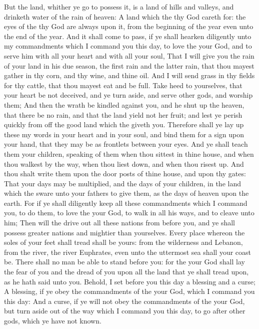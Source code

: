 \begin{biblechapter}
\verse But the land, whither ye go to possess it, is a land of hills and valleys, and drinketh water of the rain of heaven:
\verse A land which the \LORD thy God careth for: the eyes of the \LORD thy God are always upon it, from the beginning of the year even unto the end of the year.
\verse And it shall come to pass, if ye shall hearken diligently unto my commandments which I command you this day, to love the \LORD your God, and to serve him with all your heart and with all your soul,
\verse That I will give you the rain of your land in his due season, the first rain and the latter rain, that thou mayest gather in thy corn, and thy wine, and thine oil.
\verse And I will send grass in thy fields for thy cattle, that thou mayest eat and be full.
\verse Take heed to yourselves, that your heart be not deceived, and ye turn aside, and serve other gods, and worship them;
\verse And then the \LORDs wrath be kindled against you, and he shut up the heaven, that there be no rain, and that the land yield not her fruit; and lest ye perish quickly from off the good land which the \LORD giveth you.
\verse Therefore shall ye lay up these my words in your heart and in your soul, and bind them for a sign upon your hand, that they may be as frontlets between your eyes.
\verse And ye shall teach them your children, speaking of them when thou sittest in thine house, and when thou walkest by the way, when thou liest down, and when thou risest up.
\verse And thou shalt write them upon the door posts of thine house, and upon thy gates:
\verse That your days may be multiplied, and the days of your children, in the land which the \LORD sware unto your fathers to give them, as the days of heaven upon the earth.
\verse For if ye shall diligently keep all these commandments which I command you, to do them, to love the \LORD your God, to walk in all his ways, and to cleave unto him;
\verse Then will the \LORD drive out all these nations from before you, and ye shall possess greater nations and mightier than yourselves.
\verse Every place whereon the soles of your feet shall tread shall be yours: from the wilderness and Lebanon, from the river, the river Euphrates, even unto the uttermost sea shall your coast be.
\verse There shall no man be able to stand before you: for the \LORD your God shall lay the fear of you and the dread of you upon all the land that ye shall tread upon, as he hath said unto you.
\verse Behold, I set before you this day a blessing and a curse;
\verse A blessing, if ye obey the commandments of the \LORD your God, which I command you this day:
\verse And a curse, if ye will not obey the commandments of the \LORD your God, but turn aside out of the way which I command you this day, to go after other gods, which ye have not known.

\end{biblechapter}
